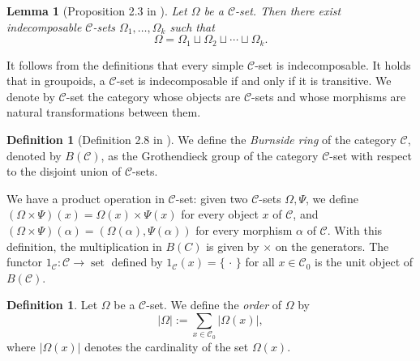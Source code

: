 \documentclass[a4paper]{article}
\newtheorem{lem}[thm]{Lemma}
\theoremstyle{definition}
\newtheorem{defi}[thm]{Definition}
\theoremstyle{remark}
\newcommand*{\cat}[1]{\mathcal{#1}}
\newcommand*{\set}{\operatorname*{set}}
\begin{document}
\begin{lem}[Proposition 2.3 in \cite{Webb23}]
Let $\Omega$ be a $\cat{C}$-set. Then there exist indecomposable $\cat{C}$-sets $\Omega_1,\ldots,\Omega_k$ such that
\[
\Omega=\Omega_1\sqcup\Omega_2\sqcup\cdots\sqcup\Omega_k.
\]
\end{lem}

It follows from the definitions that every simple $\cat{C}$-set is indecomposable. It holds that in groupoids, a $\cat{C}$-set is indecomposable if and only if it is transitive.
We denote by $\cat{C}$-set the category whose objects are $\cat{C}$-sets and whose morphisms are natural transformations between them. 
\begin{defi}[Definition 2.8 in \cite{Webb23} ]
	We define the \textit{Burnside ring} of the category $\cat{C}$, denoted by $B(\cat{C})$, as the Grothendieck group of the category $\cat{C}$-set with respect to the disjoint union of $\cat{C}$-sets.
\end{defi}

	We have a product operation in $\cat{C}$-set: given two $\cat{C}$-sets $\Omega, \Psi$, we define $(\Omega \times \Psi)(x) = \Omega(x) \times \Psi(x)$ for every object $x$ of $\cat{C}$, and $(\Omega \times \Psi)(\alpha) = (\Omega(\alpha), \Psi(\alpha))$ for every morphism $\alpha$ of $\cat{C}$. With this definition, the multiplication in $B(C)$ is given by $\times$ on the generators.
The functor $1 _\cat{C}\colon \cat{C} \to \set$ defined by $1_\cat{C}(x) = \{\, \cdot \,\}$ for all $x \in \cat{C}_0$ is the unit object of $B(\cat{C})$.

\begin{defi}
Let $\Omega$ be a $\cat{C}$-set. We define the \emph{order} of $\Omega$ by
\[
|\Omega| := \sum_{x\in\cat{C}_0} |\Omega(x)|,
\]
where $|\Omega(x)|$ denotes the cardinality of the set  $\Omega(x)$.
\end{defi}
\end{document}
